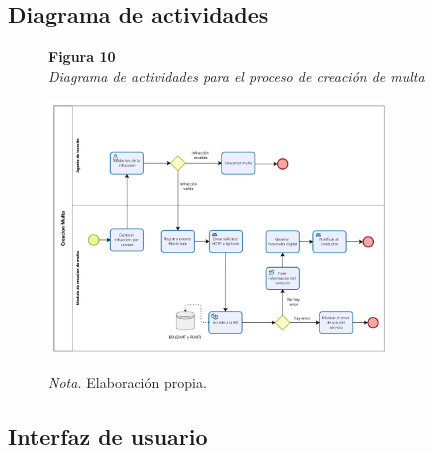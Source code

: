 \subsection{Diagrama de actividades}
 \begin{figure}[htbp]
    \begin{flushleft}
        \textbf{Figura 10}\\[2em]
        \textit{Diagrama de actividades para el proceso de creación de multa}
    \end{flushleft}
    \vspace{1em}
    \centering
    \includegraphics[width=0.8\textwidth]{Images/ActMulta.png}
    \vspace{2em}
    \begin{flushleft}
        \textit{Nota.} Elaboración propia.
    \end{flushleft}
    \label{fig:diagrama_creacion_multa}
\end{figure}

\subsection{Interfaz de usuario}
